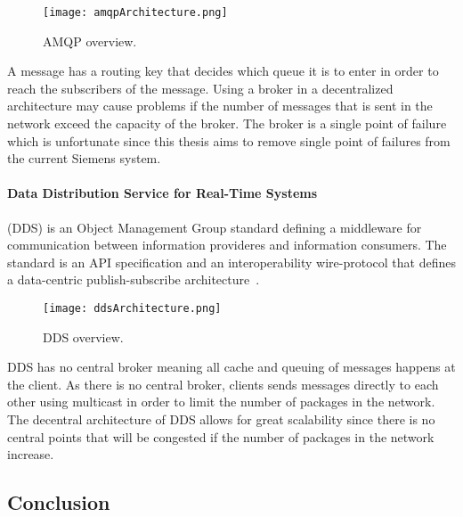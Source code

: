 \begin{figure}[!h]
	\centering
	\texttt{[image: amqpArchitecture.png]} 
	\caption[JMS overview]{
		\label{fig:amqpOverview} 
		\footnotesize{%
			AMQP overview.
		}
	}
\end{figure}

A message has a routing key that decides which queue it is to enter in order to reach the subscribers of the message. Using a broker in a decentralized architecture may cause problems if the number of messages that is sent in the network exceed the capacity of the broker.
The broker is a single point of failure which is unfortunate since this thesis aims to remove single point of failures from the current Siemens system.

\paragraph{Data Distribution Service for Real-Time Systems} (DDS) is an Object Management Group standard defining a middleware for communication between information provideres and information consumers.
The standard is an API specification and an interoperability wire-protocol that defines a data-centric publish-subscribe architecture~\cite{pardo2003omg}.

\begin{figure}[!h]
	\centering
	\texttt{[image: ddsArchitecture.png]} 
	\caption[JMS overview]{
		\label{fig:ddsOverview} 
		\footnotesize{%
			DDS overview.
		}
	}
\end{figure}

DDS has no central broker meaning all cache and queuing of messages happens at the client. As there is no central broker, clients sends messages directly to each other using multicast in order to limit the number of packages in the network. The decentral architecture of DDS allows for great scalability since there is no central points that will be congested if the number of packages in the network increase.

\subsection{Conclusion}

